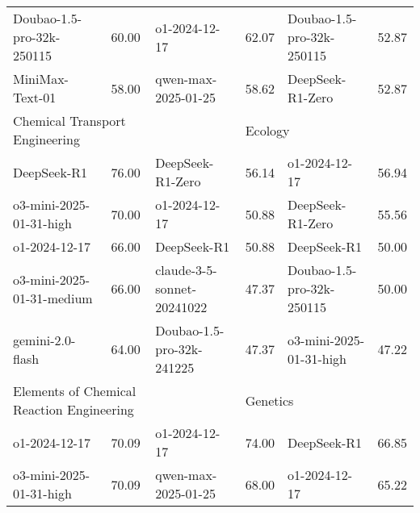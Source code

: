 {\begin{longtable}{p{4.2cm}>{\centering\arraybackslash} p{0.8cm}|p{4.2cm} >{\centering\arraybackslash} p{0.8cm}|p{4.2cm} >{\centering\arraybackslash} p{0.8cm}}
\cellcolor{blue!5} Doubao-1.5-pro-32k-250115 & \cellcolor{blue!2}60.00 & \cellcolor{red!5} o1-2024-12-17 & \cellcolor{red!2} 62.07 & \cellcolor{green!5} Doubao-1.5-pro-32k-250115 & \cellcolor{green!2} 52.87\\
\cellcolor{blue!5} MiniMax-Text-01 & \cellcolor{blue!2}58.00 & \cellcolor{red!5} qwen-max-2025-01-25 & \cellcolor{red!2} 58.62 & \cellcolor{green!5} DeepSeek-R1-Zero & \cellcolor{green!2} 52.87\\
\hline
\multicolumn{2}{p{5.15cm}|}{\cellcolor{blue!10} \centering Chemical Transport Engineering} & \multicolumn{2}{p{5.15cm}|}{\cellcolor{red!10} \centering International Law} & \multicolumn{2}{p{5.15cm}}{\cellcolor{green!10} \centering Ecology}\\
\hline
\cellcolor{blue!5} DeepSeek-R1 & \cellcolor{blue!2}76.00 & \cellcolor{red!5} DeepSeek-R1-Zero & \cellcolor{red!2} 56.14 & \cellcolor{green!5} o1-2024-12-17 & \cellcolor{green!2} 56.94\\
\cellcolor{blue!5} o3-mini-2025-01-31-high & \cellcolor{blue!2}70.00 & \cellcolor{red!5} o1-2024-12-17 & \cellcolor{red!2} 50.88 & \cellcolor{green!5} DeepSeek-R1-Zero & \cellcolor{green!2} 55.56\\
\cellcolor{blue!5} o1-2024-12-17 & \cellcolor{blue!2}66.00 & \cellcolor{red!5} DeepSeek-R1 & \cellcolor{red!2} 50.88 & \cellcolor{green!5} DeepSeek-R1 & \cellcolor{green!2} 50.00\\
\cellcolor{blue!5} o3-mini-2025-01-31-medium & \cellcolor{blue!2}66.00 & \cellcolor{red!5} claude-3-5-sonnet-20241022 & \cellcolor{red!2} 47.37 & \cellcolor{green!5} Doubao-1.5-pro-32k-250115 & \cellcolor{green!2} 50.00\\
\cellcolor{blue!5} gemini-2.0-flash & \cellcolor{blue!2}64.00 & \cellcolor{red!5} Doubao-1.5-pro-32k-241225 & \cellcolor{red!2} 47.37 & \cellcolor{green!5} o3-mini-2025-01-31-high & \cellcolor{green!2} 47.22\\
\hline
\multicolumn{2}{p{5.15cm}|}{\cellcolor{blue!10} \centering Elements of Chemical Reaction Engineering} & \multicolumn{2}{p{5.15cm}|}{\cellcolor{red!10} \centering Law and Social Governance} & \multicolumn{2}{p{5.15cm}}{\cellcolor{green!10} \centering Genetics}\\
\hline
\cellcolor{blue!5} o1-2024-12-17 & \cellcolor{blue!2}70.09 & \cellcolor{red!5} o1-2024-12-17 & \cellcolor{red!2} 74.00 & \cellcolor{green!5} DeepSeek-R1 & \cellcolor{green!2} 66.85\\
\cellcolor{blue!5} o3-mini-2025-01-31-high & \cellcolor{blue!2}70.09 & \cellcolor{red!5} qwen-max-2025-01-25 & \cellcolor{red!2} 68.00 & \cellcolor{green!5} o1-2024-12-17 & \cellcolor{green!2} 65.22\\

\end{longtable}}
